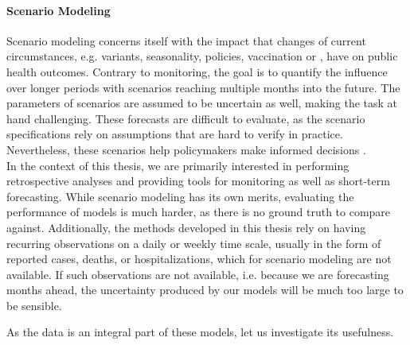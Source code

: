 \paragraph{Scenario Modeling}
Scenario modeling concerns itself with the impact that changes of current circumstances, e.g. variants, seasonality, policies, vaccination or , have on public health outcomes. Contrary to monitoring, the goal is to quantify the influence over longer periods with scenarios reaching multiple months into the future. The parameters of scenarios are assumed to be uncertain as well, making the task at hand challenging. These forecasts are difficult to evaluate, as the scenario specifications rely on assumptions that are hard to verify in practice. Nevertheless, these scenarios help policymakers make informed decisions \cite{Borchering2023Public}.\\[20pt]
In the context of this thesis, we are primarily interested in performing retrospective analyses and providing tools for monitoring as well as short-term forecasting. While scenario modeling has its own merits, evaluating the performance of models is much harder, as there is no ground truth to compare against. Additionally, the methods developed in this thesis rely on having recurring observations on a daily or weekly time scale, usually in the form of reported cases, deaths, or hospitalizations, which for scenario modeling are not available. If such observations are not available, i.e. because we are forecasting months ahead, the uncertainty produced by our models will be much too large to be sensible. 

As the data is an integral part of these models, let us investigate its usefulness.